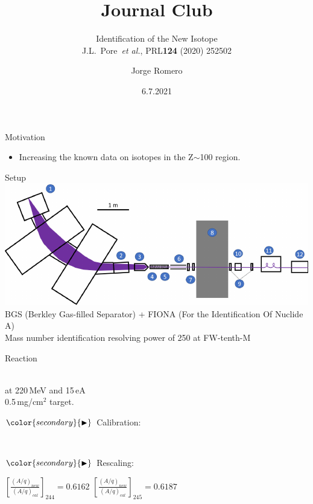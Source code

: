 \documentclass{beamer}
\title{Journal Club}
\subtitle{Identification of the New Isotope \ce{^{244}Md}\\ J.L.~Pore~\textit{et al.}, PRL\textbf{124} (2020) 252502}
\date{6.7.2021}
\author[auth]{Jorge Romero}
\institute[inst]{Jyväskylän Yliopisto}
\begin{document}
\begin{frame}
\titlepage
\end{frame}

\begin{frame}{Motivation}
    \begin{itemize}
        \item Increasing the known data on isotopes in the Z$\sim$100 region.
    \end{itemize}
\end{frame}
\begin{frame}{Setup}
    \centering
    \includegraphics{assets/Fiona.pdf}\\
    BGS (Berkley Gas-filled Separator)  + FIONA (For the Identification Of Nuclide A)\\
    Mass number identification resolving power of 250 at FW-tenth-M  
    
\end{frame}
\begin{frame}{Reaction}
    \begin{center}
        \textbf{}\\
         at 220\,MeV and 15\,e\textmu A \\
        0.5\,mg/cm$^2$  target.
    \end{center}
$\color{secondary}{\blacktriangleright}$ Calibration:
\begin{center}
    \\
\end{center}
$\color{secondary}{\blacktriangleright}$ Rescaling:
\begin{center}
    $\left[\frac{(A/q)_{new}}{(A/q)_{cal}}\right]_{244} = 0.6162$\hspace{2em} $\left[\frac{(A/q)_{new}}{(A/q)_{cal}}\right]_{245}=0.6187$
\end{center}
\end{frame}
\end{document}
